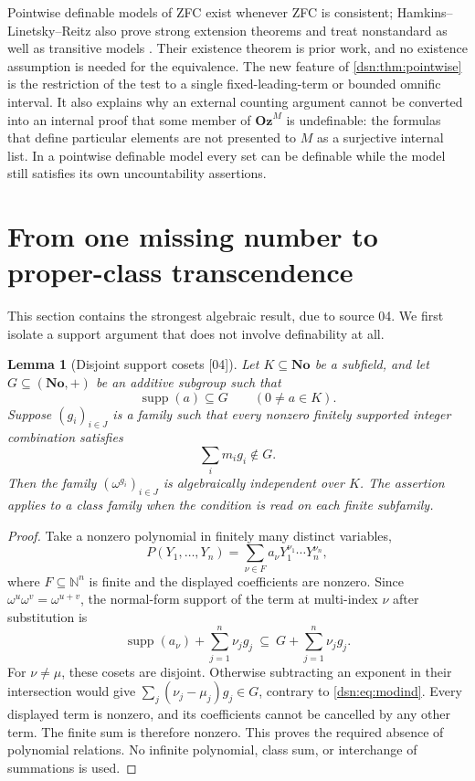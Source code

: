 \documentclass[11pt,a4paper]{article}
\numberwithin{equation}{section}
\newtheorem{lemma}[lemma]{Lemma}
\theoremstyle{definition}
\theoremstyle{remark}
\newcommand{\No}{\mathbf{No}}
\newcommand{\Oz}{\mathbf{Oz}}
\newcommand{\N}{\mathbb N}
\newcommand{\supp}{\operatorname{supp}}
\newcommand{\src}[1]{\textup{\textsf{\small[#1]}}}
\begin{document}
Pointwise definable models of ZFC exist whenever ZFC is consistent;
Hamkins--Linetsky--Reitz also prove strong extension theorems and treat
nonstandard as well as transitive models \cite{HLR}. Their existence
theorem is prior work, and no existence assumption is needed for the
equivalence. The new feature of \cref{dsn:thm:pointwise} is the
restriction of the test to a single fixed-leading-term or bounded omnific
interval. It also explains why an external counting argument cannot be
converted into an internal proof that some member of $\Oz^M$ is
undefinable: the formulas that define particular elements are not
presented to $M$ as a surjective internal list. In a pointwise definable
model every set can be definable while the model still satisfies its own
uncountability assertions.

\section{From one missing number to proper-class transcendence}
\label{dsn:sec:transcendence}

This section contains the strongest algebraic result, due to source 04.
We first isolate a support argument that does not involve definability at
all.

\begin{lemma}[Disjoint support cosets \src{04}]\label{dsn:lem:cosets}
Let $K\subseteq\No$ be a subfield, and let $G\subseteq(\No,+)$ be an
additive subgroup such that
\[
 \supp(a)\subseteq G\qquad(0\ne a\in K).
\]
Suppose $(g_i)_{i\in J}$ is a family such that every nonzero finitely
supported integer combination satisfies
\begin{equation}\label{dsn:eq:modind}
 \sum_i m_i g_i\notin G.
\end{equation}
Then the family $(\omega^{g_i})_{i\in J}$ is algebraically independent
over $K$. The assertion applies to a class family when the condition
is read on each finite subfamily.
\end{lemma}
\begin{proof}
Take a nonzero polynomial in finitely many distinct variables,
\[
 P(Y_1,\ldots,Y_n)=\sum_{\nu\in F}a_\nu Y_1^{\nu_1}\cdots
 Y_n^{\nu_n},
\]
where $F\subseteq\N^n$ is finite and the displayed coefficients are
nonzero. Since $\omega^u\omega^v=\omega^{u+v}$, the normal-form
support of the term at multi-index $\nu$ after substitution is
\begin{equation}\label{dsn:eq:supportshift}
 \supp(a_\nu)+\sum_{j=1}^n\nu_jg_j
 \ \subseteq\ G+\sum_{j=1}^n\nu_jg_j.
\end{equation}
For $\nu\ne\mu$, these cosets are disjoint. Otherwise subtracting an
exponent in their intersection would give
$\sum_j(\nu_j-\mu_j)g_j\in G$, contrary to \eqref{dsn:eq:modind}.
Every displayed term is nonzero, and its coefficients cannot be
cancelled by any other term. The finite sum is therefore nonzero.
This proves the required absence of polynomial relations. No infinite
polynomial, class sum, or interchange of summations is used.
\end{proof}
\end{document}

